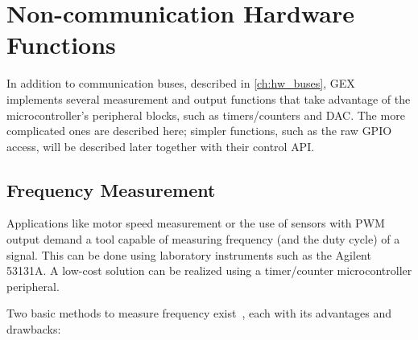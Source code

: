 \chapter{Non-communication Hardware Functions}

In addition to communication buses, described in \cref{ch:hw_buses}, GEX implements several measurement and output functions that take advantage of the microcontroller's peripheral blocks, such as timers/counters and \gls{DAC}. The more complicated ones are described here; simpler functions, such as the raw \gls{GPIO} access, will be described later together with their control \gls{API}.

\section{Frequency Measurement} \label{sec:theory_fcap}

Applications like motor speed measurement or the use of sensors with \gls{PWM} output demand a tool capable of measuring frequency (and the duty cycle) of a signal. This can be done using laboratory instruments such as the Agilent 53131A. A low-cost solution can be realized using a timer/counter microcontroller peripheral.

\noindent
Two basic methods to measure frequency exist~\cite{fcap-twotypes}, each with its advantages and drawbacks:

